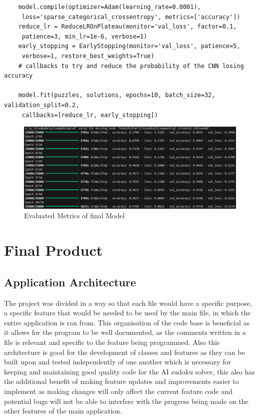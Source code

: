 \documentclass[]{final_report}
\begin{document}
\begin{verbatim}
    model.compile(optimizer=Adam(learning_rate=0.0001), 
     loss='sparse_categorical_crossentropy', metrics=['accuracy'])
    reduce_lr = ReduceLROnPlateau(monitor='val_loss', factor=0.1, 
     patience=3, min_lr=1e-6, verbose=1)
    early_stopping = EarlyStopping(monitor='val_loss', patience=5, 
     verbose=1, restore_best_weights=True)
    # callbacks to try and reduce the probability of the CNN losing accuracy

    model.fit(puzzles, solutions, epochs=10, batch_size=32, validation_split=0.2,
     callbacks=[reduce_lr, early_stopping])
\end{verbatim}

\begin{figure}[ht]
    \centering 
    \begin{minipage}{1.0\textwidth} 
        \includegraphics[width=\textwidth]{images/final model metrics.png} 
        \caption{Evaluated Metrics of final Model}
        \label{fig: Evaluated Metrics of final Model} 
    \end{minipage} 
    \hfill 
\end{figure}

\chapter{Final Product}

\section{Application Architecture}

The project was divided in a way so that each file would have a specific purpose, a specific feature that would be needed to be used by the main file, in which the entire application is ran from. This organisation of the code base is beneficial as it allows for the program to be well documented, as the comments written in a file is relevant and specific to the feature being programmed. Also this architecture is good for the development of classes and features as they can be built upon and tested independently of one another which is necessary for keeping and maintaining good quality code for the AI sudoku solver, this also has the additional benefit of making feature updates and improvements easier to implement as making changes will only affect the current feature code and potential bugs will not be able to interfere with the progress being made on the other features of the main application. 
\end{document}
